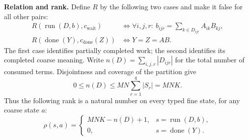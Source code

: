 \documentclass[11pt]{article}
\begin{document}
\textbf{Relation and rank.} Define $R$ by the following two cases and make it false for all other pairs:
\begin{align}
 R(\operatorname{run}(D,b),c_{\mathrm{wait}})
 &\Longleftrightarrow
 \forall i,j,r:\ b_{ijr}=\sum_{k\in D_{ijr}}A_{ik}B_{kj},
 \label{eq:accumulator-invariant}\\
 R(\operatorname{done}(Y),c_{\mathrm{done}}(Z))
 &\Longleftrightarrow Y=Z=AB.
\end{align}
The first case identifies partially completed work; the second identifies its completed coarse meaning. Write $n(D)=\sum_{i,j,r}|D_{ijr}|$ for the total number of consumed terms. Disjointness and coverage of the partition give
\begin{equation}
 0\le n(D)\le MN\sum_{r=1}^{q}|S_r|=MNK.
\end{equation}
Thus the following rank is a natural number on every typed fine state, for any coarse state $a$:
\begin{equation}
 \rho(s,a)=
 \begin{cases}
  MNK-n(D)+1,&s=\operatorname{run}(D,b),\\
  0,&s=\operatorname{done}(Y).
 \end{cases}
 \label{eq:gemm-rank}
\end{equation}
\end{document}

